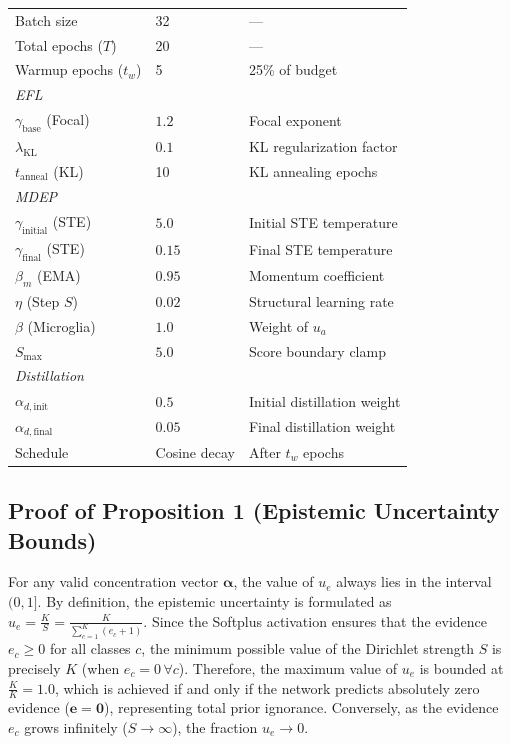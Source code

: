 \documentclass[letterpaper]{article} %
\begin{document}
\begin{table}[H]
\begin{tabular}{@{}lll@{}}
Batch size & 32 & --- \\
Total epochs ($T$) & 20 & --- \\
Warmup epochs ($t_w$) & 5 & 25\% of budget \\
\midrule
\multicolumn{3}{l}{\emph{EFL}} \\
$\gamma_{\text{base}}$ (Focal) & $1.2$ & Focal exponent \\
$\lambda_{\text{KL}}$ & $0.1$ & KL regularization factor \\
$t_{\text{anneal}}$ (KL) & 10 & KL annealing epochs \\
\midrule
\multicolumn{3}{l}{\emph{MDEP}} \\
$\gamma_{\text{initial}}$ (STE) & $5.0$ & Initial STE temperature \\
$\gamma_{\text{final}}$ (STE) & $0.15$ & Final STE temperature \\
$\beta_m$ (EMA) & $0.95$ & Momentum coefficient \\
$\eta$ (Step $S$) & $0.02$ & Structural learning rate \\
$\beta$ (Microglia) & $1.0$ & Weight of $u_a$ \\
$S_{\max}$ & $5.0$ & Score boundary clamp \\
\midrule
\multicolumn{3}{l}{\emph{Distillation}} \\
$\alpha_{d,\text{init}}$ & $0.5$ & Initial distillation weight \\
$\alpha_{d,\text{final}}$ & $0.05$ & Final distillation weight \\
Schedule & Cosine decay & After $t_w$ epochs \\
\bottomrule
\end{tabular}
\end{table}


\subsection{Proof of Proposition 1 (Epistemic Uncertainty Bounds)}
For any valid concentration vector $\bm{\alpha}$, the value of $u_e$ always lies in the interval $(0, 1]$. By definition, the epistemic uncertainty is formulated as $u_e = \frac{K}{S} = \frac{K}{\sum_{c=1}^K (e_c + 1)}$. Since the Softplus activation ensures that the evidence $e_c \ge 0$ for all classes $c$, the minimum possible value of the Dirichlet strength $S$ is precisely $K$ (when $e_c = 0 \, \forall c$). Therefore, the maximum value of $u_e$ is bounded at $\frac{K}{K} = 1.0$, which is achieved if and only if the network predicts absolutely zero evidence ($\bm{e} = \bm{0}$), representing total prior ignorance. Conversely, as the evidence $e_c$ grows infinitely ($S \to \infty$), the fraction $u_e \to 0$.
\end{document}
